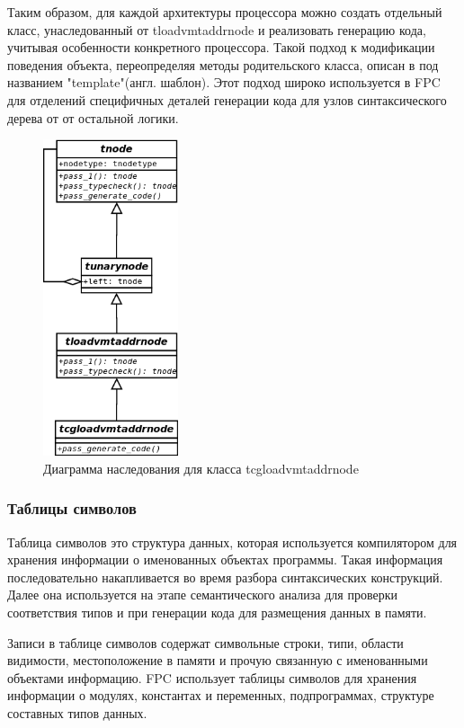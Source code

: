 \documentclass{imcs}
\begin{document}
Таким образом, для каждой архитектуры процессора можно создать отдельный класс, 
унаследованный от tloadvmtaddrnode и реализовать генерацию кода, 
учитывая особенности конкретного процессора.
Такой подход к модификации поведения объекта, переопределяя методы родительского класса,
описан в \cite{gof} под названием "template"(англ. шаблон). Этот подход широко
используется в FPC для отделений специфичных деталей генерации кода для узлов синтаксического
дерева от от остальной логики.

\begin{figure}[htb]
\centering
\includegraphics[width=150px]{./uml/cgnodeexample.png}
\caption{Диаграмма наследования для класса tcgloadvmtaddrnode}
\label{tcgloadvmtaddrnode}
\end{figure}

\pagebreak

\subsubsection{Таблицы символов}

Таблица символов это структура данных, которая используется компилятором для хранения 
информации о именованных объектах программы. Такая информация последовательно накапливается во время
разбора синтаксических конструкций. Далее она используется на этапе семантического анализа 
для проверки соответствия типов и при генерации кода для размещения данных в памяти.

Записи в таблице символов содержат символьные строки, типи, области видимости, 
местоположение в памяти и прочую связанную с именованными объектами информацию.
FPC использует таблицы символов для хранения информации о модулях,
константах и переменных, подпрограммах, структуре составных типов данных.
\end{document}
